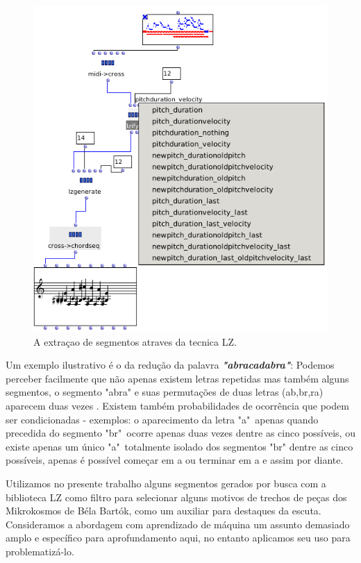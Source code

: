 \documentclass[
	12pt,				%
	openright,			%
	twoside,			%
	a4paper,			%
	english,			%
	french,				%
	spanish,			%
	brazil				%
	]{abntex2}
\begin{document}
\begin{figure}[!h]
	\caption{\label{fig_grafico}A extraçao de segmentos atraves da tecnica LZ. }
	\begin{center}
	    \includegraphics[scale=0.55]{OM_settheory/LZfy.png}
	\end{center}
\end{figure}



Um exemplo ilustrativo é o da redução da palavra \textbf{\textit{"abracadabra"}}: Podemos perceber facilmente que não apenas existem letras repetidas mas também alguns segmentos, o segmento "abra" e suas permutações de duas letras (ab,br,ra) aparecem duas vezes . Existem também probabilidades de ocorrência que podem ser condicionadas - exemplos: o aparecimento da letra "a"\ apenas quando precedida do segmento "br"\ ocorre apenas duas vezes dentre as cinco possíveis, ou existe apenas um único "a"\ totalmente isolado dos segmentos "br" dentre as cinco possíveis, apenas é possível começar em a ou terminar em a e assim por diante.

Utilizamos no presente trabalho alguns segmentos gerados por busca com a biblioteca LZ como filtro para selecionar alguns motivos de trechos de peças dos Mikrokosmos de Béla Bartók, como um auxiliar para destaques da escuta. Consideramos a abordagem com aprendizado de máquina um assunto demasiado amplo e específico para aprofundamento aqui, no entanto aplicamos seu uso para problematizá-lo.
\end{document}
